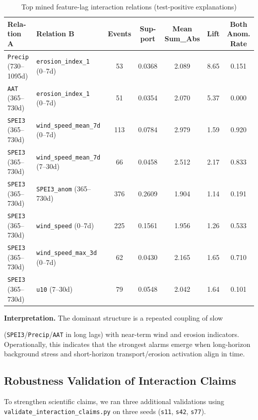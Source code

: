 \documentclass[12pt,a4paper]{article}
\begin{document}
\begin{latin}
\begin{table}[H]
\centering
\caption{Top mined feature-lag interaction relations (test-positive explanations)}
\label{tab:interaction_relations}
\small
\begin{tabular}{P{3.9cm}P{3.9cm}ccccc}
\toprule
Relation A & Relation B & Events & Support & Mean Sum\_Abs & Lift & Both Anom. Rate \\
\midrule
\texttt{Precip} (730--1095d) & \texttt{erosion\_index\_1} (0--7d) & 53 & 0.0368 & 2.089 & 8.65 & 0.151 \\
\texttt{AAT} (365--730d) & \texttt{erosion\_index\_1} (0--7d) & 51 & 0.0354 & 2.070 & 5.37 & 0.000 \\
\texttt{SPEI3} (365--730d) & \texttt{wind\_speed\_mean\_7d} (0--7d) & 113 & 0.0784 & 2.979 & 1.59 & 0.920 \\
\texttt{SPEI3} (365--730d) & \texttt{wind\_speed\_mean\_7d} (7--30d) & 66 & 0.0458 & 2.512 & 2.17 & 0.833 \\
\texttt{SPEI3} (365--730d) & \texttt{SPEI3\_anom} (365--730d) & 376 & 0.2609 & 1.904 & 1.14 & 0.191 \\
\texttt{SPEI3} (365--730d) & \texttt{wind\_speed} (0--7d) & 225 & 0.1561 & 1.956 & 1.26 & 0.533 \\
\texttt{SPEI3} (365--730d) & \texttt{wind\_speed\_max\_3d} (0--7d) & 62 & 0.0430 & 2.165 & 1.65 & 0.710 \\
\texttt{SPEI3} (365--730d) & \texttt{u10} (7--30d) & 79 & 0.0548 & 2.042 & 1.64 & 0.101 \\
\bottomrule
\end{tabular}
\end{table}

\noindent\textbf{Interpretation.}
The dominant structure is a repeated coupling of slow

(\texttt{SPEI3}/\texttt{Precip}/\texttt{AAT} in long lags) with near-term wind and erosion indicators.
Operationally, this indicates that the strongest alarms emerge when long-horizon background stress and short-horizon transport/erosion activation align in time.

\subsection{Robustness Validation of Interaction Claims}
To strengthen scientific claims, we ran three additional validations using \texttt{validate\_interaction\_claims.py} on three seeds (\texttt{s11}, \texttt{s42}, \texttt{s77}).


\end{latin}
\end{document}
